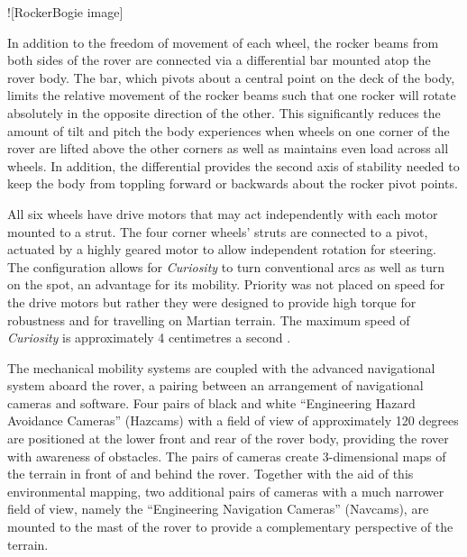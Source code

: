         ![RockerBogie image]
        
        In addition to the freedom of movement of each wheel, the rocker beams from both sides of the rover are connected via a differential bar mounted atop the rover body. The bar, which pivots about a central point on the deck of the body, limits the relative movement of the rocker beams such that one rocker will rotate absolutely in the opposite direction of the other. This significantly reduces the amount of tilt and pitch the body experiences when wheels on one corner of the rover are lifted above the other corners as well as maintains even load across all wheels. In addition, the differential provides the second axis of stability needed to keep the body from toppling forward or backwards about the rocker pivot points.
        
        All six wheels have drive motors that may act independently with each motor mounted to a strut. The four corner wheels' struts are connected to a pivot, actuated by a highly geared motor to allow independent rotation for steering. The configuration allows for \textit{Curiosity} to turn conventional arcs as well as turn on the spot, an advantage for its mobility. Priority was not placed on speed for the drive motors but rather they were designed to provide high torque for robustness and for travelling on Martian terrain. The maximum speed of \textit{Curiosity} is approximately 4 centimetres a second \cite{msllegsandwheels}.
        
        The mechanical mobility systems are coupled with the advanced navigational system aboard the rover, a pairing between an arrangement of navigational cameras and software. Four pairs of black and white ``Engineering Hazard Avoidance Cameras'' (Hazcams) with a field of view of approximately 120 degrees are positioned at the lower front and rear of the rover body, providing the rover with awareness of obstacles. The pairs of cameras create 3-dimensional maps of the terrain in front of and behind the rover. Together with the aid of this environmental mapping, two additional pairs of cameras with a much narrower field of view, namely the ``Engineering Navigation Cameras'' (Navcams), are mounted to the mast of the rover to provide a complementary perspective of the terrain.
             
